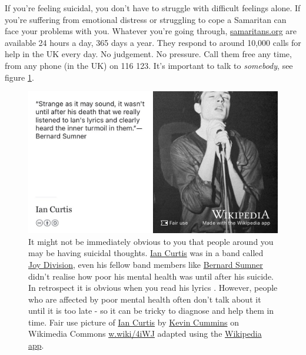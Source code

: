 \documentclass[
]{book}
\begin{document}
If you're feeling suicidal, you don't have to struggle with difficult feelings alone. If you're suffering from emotional distress or struggling to cope a Samaritan can face your problems with you. Whatever you're going through, \href{https://www.samaritans.org/}{samaritans.org} are available 24 hours a day, 365 days a year. They respond to around 10,000 calls for help in the UK every day. No judgement. No pressure. Call them free any time, from any phone (in the UK) on 116 123. It's important to talk to \emph{somebody}, see figure \ref{fig:joydivision-fig}.

\begin{figure}

{\centering \includegraphics[width=0.99\linewidth]{images/ian-curtis-joy-division} 

}

\caption{It might not be immediately obvious to you that people around you may be having suicidal thoughts. \href{https://en.wikipedia.org/wiki/Ian_Curtis}{Ian Curtis} was in a band called \href{https://en.wikipedia.org/wiki/Joy_Division}{Joy Division}, even his fellow band members like \href{https://en.wikipedia.org/wiki/Bernard_Sumner}{Bernard Sumner} didn't realise how poor his mental health was until after his suicide. In retrospect it is obvious when you read his lyrics \citep{isolation}. However, people who are affected by poor mental health often don't talk about it until it is too late - so it can be tricky to diagnose and help them in time. Fair use picture of \href{https://en.wikipedia.org/wiki/Ian_Curtis}{Ian Curtis} by \href{https://en.wikipedia.org/wiki/Kevin_Cummins_(photographer)}{Kevin Cummins} on Wikimedia Commons \href{https://w.wiki/4iWJ}{w.wiki/4iWJ} adapted using the \href{https://apps.apple.com/gb/app/wikipedia/id324715238}{Wikipedia app}.}\label{fig:joydivision-fig}
\end{figure}
\end{document}
